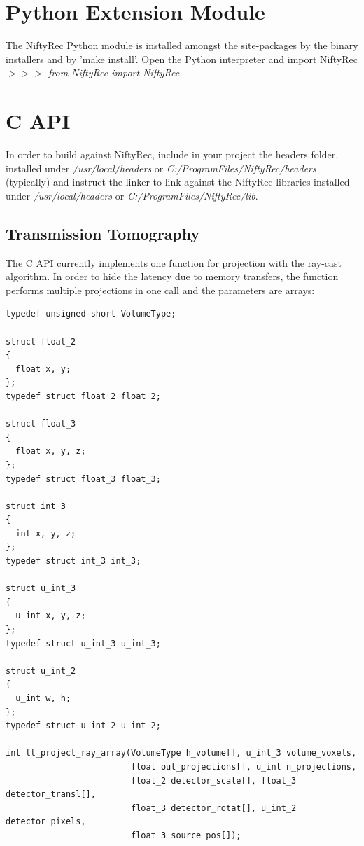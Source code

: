 \documentclass[12pt,a4paper]{report}
\begin{document}
\section{Python Extension Module}
\noindent The NiftyRec Python module is installed amongst the site-packages 
by the binary installers and by 'make install'. 
Open the Python interpreter and import NiftyRec\\

\emph{$>>>$ from NiftyRec import NiftyRec}\\

\section{C API}
In order to build against NiftyRec, include in your project the 
headers folder, installed under \emph{/usr/local/headers} or \emph{C:/ProgramFiles/NiftyRec/headers} (typically) 
and instruct the linker to link against the NiftyRec libraries installed under \emph{/usr/local/headers} or \emph{C:/ProgramFiles/NiftyRec/lib}. 

\subsection{Transmission Tomography}

The C API currently implements one function for projection with the ray-cast algorithm. 
In order to hide the latency due to memory transfers, the function performs multiple 
projections in one call and the parameters are arrays: 

\vspace{5mm}
\lstset{language=C,basicstyle=\scriptsize}
\begin{lstlisting}
typedef unsigned short VolumeType;

struct float_2
{
  float x, y;
};
typedef struct float_2 float_2;

struct float_3
{
  float x, y, z;
};
typedef struct float_3 float_3;

struct int_3
{
  int x, y, z;
};
typedef struct int_3 int_3;

struct u_int_3
{
  u_int x, y, z;
};
typedef struct u_int_3 u_int_3;

struct u_int_2
{
  u_int w, h;
};
typedef struct u_int_2 u_int_2;

int tt_project_ray_array(VolumeType h_volume[], u_int_3 volume_voxels, 
                         float out_projections[], u_int n_projections, 
                         float_2 detector_scale[], float_3 detector_transl[], 
                         float_3 detector_rotat[], u_int_2 detector_pixels, 
                         float_3 source_pos[]);
\end{lstlisting}
\vspace{5mm}
\end{document}
